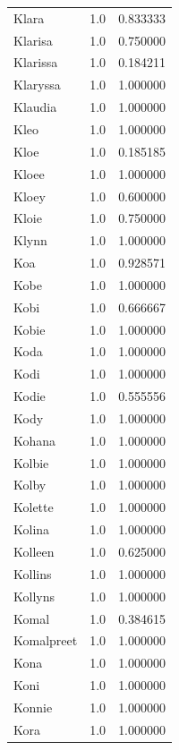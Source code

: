\documentclass[
  letterpaper,
  DIV=11,
  numbers=noendperiod]{scrreprt}
\begin{document}
\begin{tabular}{lrr}
Klara           &   1.0 &   0.833333 \\
Klarisa         &   1.0 &   0.750000 \\
Klarissa        &   1.0 &   0.184211 \\
Klaryssa        &   1.0 &   1.000000 \\
Klaudia         &   1.0 &   1.000000 \\
Kleo            &   1.0 &   1.000000 \\
Kloe            &   1.0 &   0.185185 \\
Kloee           &   1.0 &   1.000000 \\
Kloey           &   1.0 &   0.600000 \\
Kloie           &   1.0 &   0.750000 \\
Klynn           &   1.0 &   1.000000 \\
Koa             &   1.0 &   0.928571 \\
Kobe            &   1.0 &   1.000000 \\
Kobi            &   1.0 &   0.666667 \\
Kobie           &   1.0 &   1.000000 \\
Koda            &   1.0 &   1.000000 \\
Kodi            &   1.0 &   1.000000 \\
Kodie           &   1.0 &   0.555556 \\
Kody            &   1.0 &   1.000000 \\
Kohana          &   1.0 &   1.000000 \\
Kolbie          &   1.0 &   1.000000 \\
Kolby           &   1.0 &   1.000000 \\
Kolette         &   1.0 &   1.000000 \\
Kolina          &   1.0 &   1.000000 \\
Kolleen         &   1.0 &   0.625000 \\
Kollins         &   1.0 &   1.000000 \\
Kollyns         &   1.0 &   1.000000 \\
Komal           &   1.0 &   0.384615 \\
Komalpreet      &   1.0 &   1.000000 \\
Kona            &   1.0 &   1.000000 \\
Koni            &   1.0 &   1.000000 \\
Konnie          &   1.0 &   1.000000 \\
Kora            &   1.0 &   1.000000 \\

\end{tabular}
\end{document}
